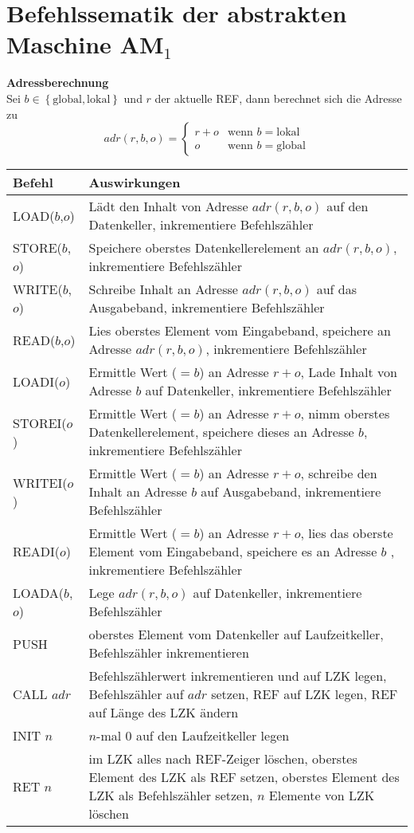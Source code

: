 \documentclass[ngerman,a4paper, 12pt]{article}
\newcommand*\head{\rowfont{\bfseries}}
\newcommand{\menge}[1]{\left\{ #1 \right\}}
\begin{document}
	\pagestyle{empty}
	
	\section*{Befehlssematik der abstrakten Maschine AM${}_{\text{1}}$}
	
	\textbf{Adressberechnung} \\
	Sei $b \in \menge{\text{global}, \text{lokal}}$ und $r$ der aktuelle REF, dann berechnet sich die Adresse zu
	\begin{equation*}
	adr(r,b,o) = \begin{cases}
	r+o & \text{wenn } b = \text{lokal} \\
	o & \text{wenn } b = \text{global}
	\end{cases}
	\end{equation*}
	
	\renewcommand*{\arraystretch}{1.6}
	\noindent
	\begin{tabu}{p{2.5cm} | p{\dimexpr\linewidth-2.5cm}}
		\toprule
		\head Befehl & Auswirkungen  \\ 
		\midrule \midrule
		LOAD($b$,$o$) & Lädt den Inhalt von Adresse $adr(r,b,o)$ auf den Datenkeller, inkrementiere Befehlszähler \\
		STORE($b$,$o$) & Speichere oberstes Datenkellerelement an $adr(r,b,o)$, inkrementiere Befehlszähler \\
		WRITE($b$,$o$) & Schreibe Inhalt an Adresse $adr(r,b,o)$ auf das
		Ausgabeband, inkrementiere Befehlszähler \\
		READ($b$,$o$) & Lies oberstes Element vom Eingabeband, speichere
		an Adresse $adr(r,b,o)$, inkrementiere Befehlszähler \\
		LOADI($o$) & Ermittle Wert ($=b$) an Adresse $r+o$, Lade Inhalt
		von Adresse $b$ auf Datenkeller, inkrementiere Befehlszähler \\
		STOREI($o$) & Ermittle Wert ($=b$) an Adresse $r+o$, nimm
		oberstes Datenkellerelement, speichere dieses an
		Adresse $b$, inkrementiere Befehlszähler \\
		WRITEI($o$) & Ermittle Wert ($=b$) an Adresse $r+o$, schreibe den
		Inhalt an Adresse $b$ auf Ausgabeband, inkrementiere Befehlszähler \\
		READI($o$) & Ermittle Wert ($=b$) an Adresse $r+o$, lies das oberste
		Element vom Eingabeband, speichere es an Adresse $b$ , inkrementiere Befehlszähler \\
		LOADA($b$,$o$) & Lege $adr(r,b,o)$ auf Datenkeller, inkrementiere Befehlszähler \\			
		PUSH & oberstes Element vom Datenkeller auf Laufzeitkeller, Befehlszähler inkrementieren \\
		CALL $adr$ & Befehlszählerwert inkrementieren und auf LZK legen, Befehlszähler auf $adr$ setzen, REF auf LZK legen, REF auf Länge des LZK ändern \\
		INIT $n$ & $n$-mal $0$ auf den Laufzeitkeller legen \\
		RET $n$ & im LZK alles nach REF-Zeiger löschen, oberstes Element des LZK als REF setzen, oberstes Element des LZK als Befehlszähler setzen, $n$ Elemente von LZK löschen \\
		\bottomrule
	\end{tabu}
\end{document}
